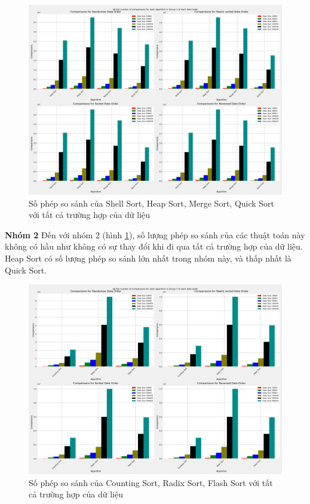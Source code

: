 \begin{figure}[H]
    \centering
    \includegraphics[width=\textwidth]{experimental_result/images/all_the_number_of_comparisons_for_each_algorithm_in_group_2_of_each_data_order.png}
    \caption{Số phép so sánh của Shell Sort, Heap Sort, Merge Sort, Quick Sort với tất cả trường hợp của dữ liệu}
    \label{fig:all_the_number_of_comparisons_for_each_algorithm_in_group_2_of_each_data_order}
\end{figure}

\textbf{Nhóm 2}
Đến với nhóm 2 (hình \ref{fig:all_the_number_of_comparisons_for_each_algorithm_in_group_2_of_each_data_order}), số lượng phép so sánh của các thuật toán này không có hầu như không có sự thay đổi khi đi qua tất cả trường hợp của dữ liệu. Heap Sort có số lượng phép so sánh lớn nhất trong nhóm này, và thấp nhất là Quick Sort. 




\begin{figure}[H]
    \centering
    \includegraphics[width=\textwidth]{experimental_result/images/all_the_number_of_comparisons_for_each_algorithm_in_group_3_of_each_data_order.png}
    \caption{Số phép so sánh của Counting Sort, Radix Sort, Flash Sort với tất cả trường hợp của dữ liệu}
    \label{fig:all_the_number_of_comparisons_for_each_algorithm_in_group_3_of_each_data_order}
\end{figure}

